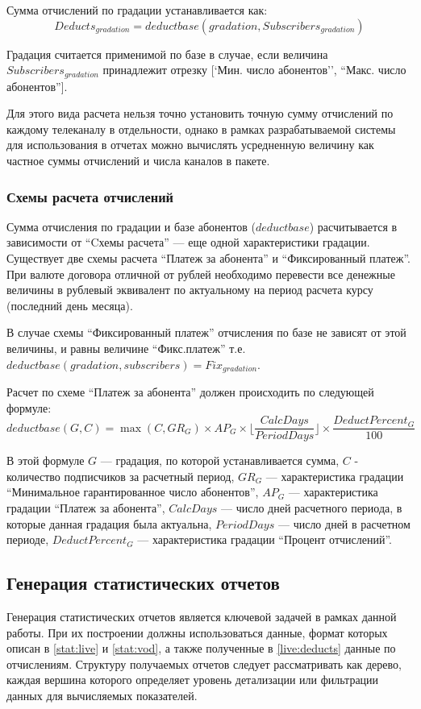 Сумма отчислений по градации устанавливается как:
$$Deducts_{gradation} = deductbase(gradation, Subscribers_{gradation})$$

Градация считается применимой по базе в случае, если величина $Subscribers_{gradation}$ принадлежит отрезку 
[`Мин. число абонентов'', ``Макс. число абонентов''].

Для этого вида расчета нельзя точно установить точную сумму отчислений по каждому телеканалу в отдельности,
однако в рамках разрабатываемой системы для использования в отчетах можно вычислять усредненную величину как частное 
суммы отчислений и числа каналов в пакете.

\subsubsection{Схемы расчета отчислений}
Сумма отчисления по градации и базе абонентов ($deductbase$) расчитывается в зависимости от 
``Cхемы расчета'' --- еще одной характеристики градации. Существует две схемы расчета ``Платеж за абонента''
и ``Фиксированный платеж''. При валюте договора отличной от рублей необходимо перевести все денежные величины
в рублевый эквивалент по актуальному на период расчета курсу (последний день месяца).

В случае схемы ``Фиксированный платеж'' отчисления по базе не зависят от этой величины, и равны величине ``Фикс.платеж'' т.е. 
$ deductbase(gradation, subscribers) = Fix_{gradation} $.

Расчет по схеме ``Платеж за абонента'' должен происходить по следующей формуле:
$$ deductbase(G, C) =  \max(C, GR_{G}) \times AP_{G} \times \lfloor \frac{CalcDays}{PeriodDays} \rfloor \times \frac{DeductPercent_{G}}{100}$$

В этой формуле $G$ --- градация, по которой устанавливается сумма, $C$ - количество подписчиков за расчетный период,
$GR_{G}$ --- характеристика градации ``Минимальное гарантированное число абонентов'',
$AP_{G}$ --- характеристика градации ``Платеж за абонента'',
$CalcDays$ --- число дней расчетного периода, в которые данная градация была актуальна,
$PeriodDays$ --- число дней в расчетном периоде,
$DeductPercent_{G}$ --- характеристика градации ``Процент отчислений''.

\subsection{Генерация статистических отчетов}
Генерация статистических отчетов является ключевой задачей в рамках данной работы. При их построении должны использоваться
данные, формат которых описан в \ref{stat:live} и \ref{stat:vod}, а также полученные в \ref{live:deducts}
данные по отчислениям. 
Структуру получаемых отчетов следует рассматривать как дерево, каждая вершина которого определяет уровень детализации
или фильтрации данных для вычисляемых показателей.

